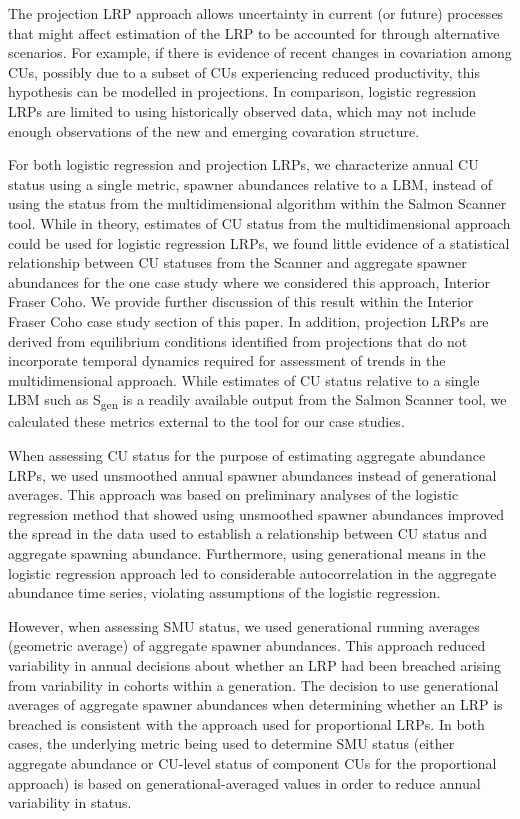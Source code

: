 \documentclass[
]{article}
\begin{document}
The projection LRP approach allows uncertainty in current (or future)
processes that might affect estimation of the LRP to be accounted for
through alternative scenarios. For example, if there is evidence of
recent changes in covariation among CUs, possibly due to a subset of CUs
experiencing reduced productivity, this hypothesis can be modelled in
projections. In comparison, logistic regression LRPs are limited to
using historically observed data, which may not include enough
observations of the new and emerging covaration structure.

For both logistic regression and projection LRPs, we characterize annual
CU status using a single metric, spawner abundances relative to a LBM,
instead of using the status from the multidimensional algorithm within
the Salmon Scanner tool. While in theory, estimates of CU status from
the multidimensional approach could be used for logistic regression
LRPs, we found little evidence of a statistical relationship between CU
statuses from the Scanner and aggregate spawner abundances for the one
case study where we considered this approach, Interior Fraser Coho. We
provide further discussion of this result within the Interior Fraser
Coho case study section of this paper. In addition, projection LRPs are
derived from equilibrium conditions identified from projections that do
not incorporate temporal dynamics required for assessment of trends in
the multidimensional approach. While estimates of CU status relative to
a single LBM such as S\textsubscript{gen} is a readily available output
from the Salmon Scanner tool, we calculated these metrics external to
the tool for our case studies.

When assessing CU status for the purpose of estimating aggregate
abundance LRPs, we used unsmoothed annual spawner abundances instead of
generational averages. This approach was based on preliminary analyses
of the logistic regression method that showed using unsmoothed spawner
abundances improved the spread in the data used to establish a
relationship between CU status and aggregate spawning abundance.
Furthermore, using generational means in the logistic regression
approach led to considerable autocorrelation in the aggregate abundance
time series, violating assumptions of the logistic regression.

However, when assessing SMU status, we used generational running
averages (geometric average) of aggregate spawner abundances. This
approach reduced variability in annual decisions about whether an LRP
had been breached arising from variability in cohorts within a
generation. The decision to use generational averages of aggregate
spawner abundances when determining whether an LRP is breached is
consistent with the approach used for proportional LRPs. In both cases,
the underlying metric being used to determine SMU status (either
aggregate abundance or CU-level status of component CUs for the
proportional approach) is based on generational-averaged values in order
to reduce annual variability in status.
\end{document}

